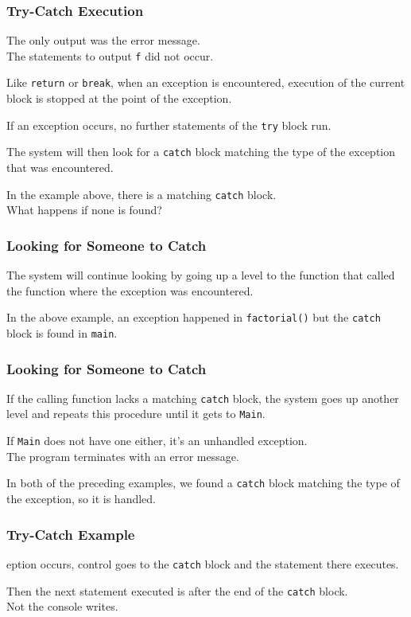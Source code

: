 \begin{frame}
\frametitle{Try-Catch Execution}

The only output was the error message.\\
\quad The statements to output \texttt{f} did not occur.

Like \texttt{return} or \texttt{break}, when an exception is encountered, execution of the current block is stopped at the point of the exception.

If an exception occurs, no further statements of the \texttt{try} block run.

The system will then look for a \texttt{catch} block matching the type of the exception that was encountered.

In the example above, there is a matching \texttt{catch} block.\\
\quad What happens if none is found?

\end{frame}

\begin{frame}[fragile]
\frametitle{Looking for Someone to Catch}

The system will continue looking by going up a level to the function that called the function where the exception was encountered.

In the above example, an exception happened in \texttt{factorial()} but the \texttt{catch} block is found in \texttt{main}.

\end{frame}

\begin{frame}
\frametitle{Looking for Someone to Catch}

If the calling function lacks a matching \texttt{catch} block, the system goes up another level and repeats this procedure until it gets to \texttt{Main}.

If \texttt{Main} does not have one either, it's an unhandled exception.\\
\quad The program terminates with an error message.

In both of the preceding examples, we found a \texttt{catch} block matching the type of the exception, so it is handled.

\end{frame}

\begin{frame}[fragile]
\frametitle{Try-Catch Example}
eption occurs, control goes to the \texttt{catch} block and the statement there executes.

Then the next statement executed is after the end of the \texttt{catch} block.\\
\quad Not the console writes.
\end{frame}


